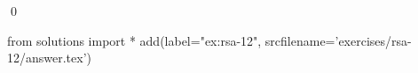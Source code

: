
\begin{ex} 
  \label{ex:rsa-12}
  
  \qed
\end{ex} 
\begin{python0}
from solutions import *
add(label="ex:rsa-12",
    srcfilename='exercises/rsa-12/answer.tex') 
\end{python0}
